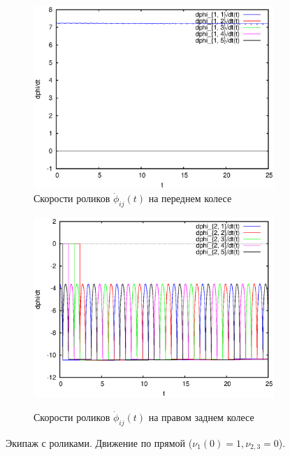 \begin{figure}
    \begin{subfigure}[t]{0.45\textwidth}
        \centering
        \includegraphics[width=\linewidth]{pic/rol__straight__velocities_of_rollers_of_wheel_1}
        \caption{Скорости роликов $\dot{\phi}_{ij}(t)$ на переднем колесе}
        \label{fig:rol__straight__velocities_of_rollers_of_wheel_1}    
    \end{subfigure}
    \hfill
    \begin{subfigure}[t]{0.45\textwidth}
        \centering
        \includegraphics[width=\linewidth]{pic/rol__straight__velocities_of_rollers_of_wheel_2} \\
        \caption{Скорости роликов $\dot{\phi}_{ij}(t)$ на правом заднем колесе}
        \label{fig:rol__straight__velocities_of_rollers_of_wheel_2}
    \end{subfigure}
    \hfill
    
    \caption{Экипаж с роликами. Движение по прямой ($\nu_1(0) = 1, \nu_{2,3} = 0$).}
    \label{fig:straight}
    
\end{figure}
